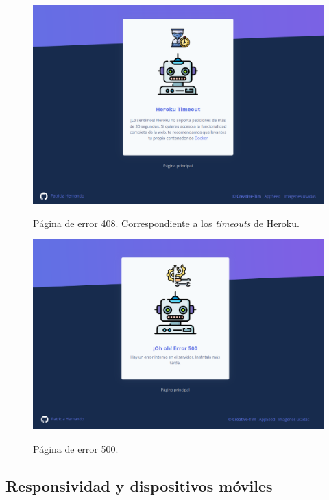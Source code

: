 \begin{figure}[h]
	\caption[Manual de usuario: error 408]{Página de error 408. Correspondiente a los \textit{timeouts} de Heroku.}
	\centering
	\includegraphics[width=\textwidth]{../img/anexos/user_guide/0_error_408}
	\label{e-0:error-408}
\end{figure}

\begin{figure}[h]
	\caption[Manual de usuario: error 500]{Página de error 500.}
	\centering
	\includegraphics[width=\textwidth]{../img/anexos/user_guide/0_error_500}
	\label{e-0:error-500}
\end{figure}


\subsection{Responsividad y dispositivos móviles}

